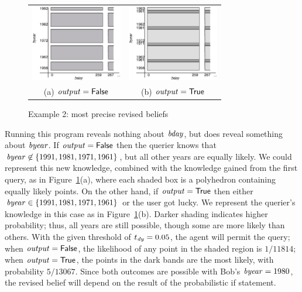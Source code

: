 \begin{figure}
\centering
\begin{tabular}{cc}
\includegraphics[width=4cm]{figures/bands1.pdf} &
\includegraphics[width=4cm]{figures/bands2.pdf} \\
(a) $\mathit{output} = \mathsf{False}$ & 
(b) $\mathit{output} = \mathsf{True}$ \\
\end{tabular}
\caption{Example 2: most precise revised beliefs}
\label{fig:bands}
\end{figure}

\ifacita 
Running this program reveals nothing about $\mathit{bday}$, but
does reveal something about $\mathit{byear}$.  If $\mathit{output} =
\mathsf{False}$ then the querier knows that $\mathit{byear} \not\in \{ 1991,
1981, 1971, 1961 \}$, but all other years are equally likely.  We
could represent this new knowledge, combined with the knowledge gained
from the first query, as in Figure~\ref{fig:bands}(a), where
each shaded box is a polyhedron containing equally likely points.  On
the other hand, if $\mathit{output} = \mathsf{True}$ then either $\mathit{byear}
\in \{ 1991, 1981, 1971, 1961 \}$ or the user got lucky.  We represent
the querier's knowledge in this case as in Figure~\ref{fig:bands}(b).
Darker shading indicates higher probability; thus, all years are still
possible, though some are more likely than others.  With the
given threshold of $t_{\mathit{dy}} = 0.05$, the agent will permit the
query; when $\mathit{output} = \mathsf{False}$, the likelihood of any point in
the shaded region is $1/11814$; when $\mathit{output} = \mathsf{True}$, the
points in the dark bands are the most likely, with probability $
5/13067 $.  Since both outcomes are possible with Bob's $\mathit{byear} =
1980$, the revised belief will depend on the result of the
probabilistic if statement. 

